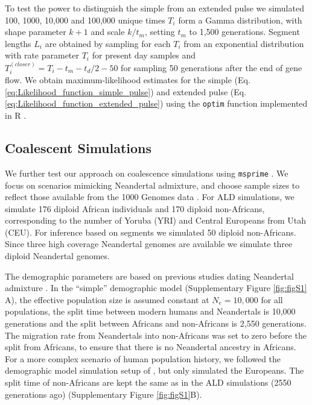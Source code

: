 \documentclass[11pt]{article}
\begin{document}
To test the power to distinguish the simple from an extended pulse we simulated 100, 1000, 10,000 and 100,000 unique times $T_i$ form a Gamma distribution, with shape parameter $k+1$ and scale  $k/t_m$, setting $t_m$ to 1,500 generations.  Segment lengths $L_i$ are obtained by sampling for each $T_i$ from an exponential distribution  with rate parameter $T_i$ for present day samples and $T_i^{(closer)}= T_i - t_m - t_d/2 - 50$ for sampling 50 generations after the end of gene flow. We obtain maximum-likelihood estimates for the simple (Eq. \ref{eq:Likelihood_function_simple_pulse}) and extended pulse (Eq. \ref{eq:Likelihood_function_extended_pulse}) using the \texttt{optim} function implemented in R \citep{R_Core_Team_2019}.

\subsection{Coalescent Simulations}\label{coalescent simulations}

We further test our approach on coalescence simulations using  \texttt{msprime} 
\citep{kelleher_efficient_2016}. We focus on scenarios mimicking Neandertal admixture, and choose sample sizes to reflect those available from the 1000 Genomes data \citep{the_1000_genomes_project_consortium_global_2015}. For ALD simulations, we simulate 176 diploid
African individuals and 170 diploid non-Africans, corresponding to the
number of Yoruba (YRI) and Central Europeans from Utah (CEU). For inference based on segments we simulated 50 diploid non-Africans.
Since three high coverage Neandertal genomes are available \citep{prufer_complete_2013,prufer_high-coverage_2017,mafessoni_high_coverage_2020} we  simulate three diploid Neandertal genomes. 

The demographic parameters are based on
previous studies dating Neandertal admixture
\citep{sankararaman_date_2012,fu_genome_2014,moorjani_genetic_2016,skov_detecting_2018}. In
the ``simple'' demographic model (Supplementary Figure  \ref{fig:figS1} A), the effective
population size is assumed constant at $N_e=10,000$ for all populations, the
split time between modern humans and Neandertals is 10,000 generations
and the split between Africans and non-Africans is 2,550
generations. The migration rate from Neandertals into non-Africans
was set to zero before the split from Africans, to ensure that there is no Neandertal
ancestry in Africans.  For a more complex scenario of human population history, we followed the demographic model simulation setup of \cite{skov_detecting_2018}, but only simulated the Europeans. The split time of  non-Africans are kept the same as in the ALD simulations (2550 generations ago) (Supplementary Figure \ref{fig:figS1}B). 
\end{document}
